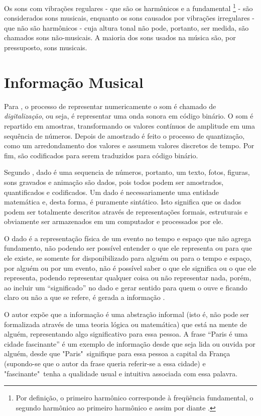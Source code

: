 Os sons com vibrações regulares - que são os harmônicos e a fundamental \footnote{Por definição, o primeiro harmônico corresponde à freqüência fundamental, o segundo harmônico ao primeiro harmônico e assim por diante \cite{muller2007}.} - são considerados sons musicais, enquanto os sons causados por vibrações irregulares - que não são harmônicos - cuja altura tonal não pode, portanto, ser medida, são chamados sons não-musicais. A maioria dos sons usados na música são, por pressuposto, sons musicais.

\section{Informação Musical}
Para , o processo de representar numericamente o som é chamado de \textit{digitalização}, ou seja, é representar uma onda sonora em código binário. O som é repartido em amostras, transformando os valores contínuos de amplitude em uma sequência de números. Depois de amostrado é feito o processo de quantização, como um arredondamento dos valores e assumem valores discretos de tempo. Por fim, são codificados para serem traduzidos para código binário.

Segundo , dado é uma sequencia de números, portanto, um texto, fotos, figuras, sons gravados e animação são dados, pois todos podem ser amostrados, quantificados e codificados. Um dado é necessariamente uma entidade matemática e, desta forma, é puramente sintático. Isto significa que os dados podem ser totalmente descritos através de representações formais, estruturais e obviamente ser armazenados em um computador e processados por ele.

O dado é a representação física de um evento no tempo e espaço que não agrega fundamento, não podendo ser possível entender o que ele representa ou para que ele existe, se somente for disponibilizado para alguém ou para o tempo e espaço, por alguém ou por um evento, não é possível saber o que ele significa ou o que ele representa, podendo representar qualquer coisa ou não representar nada, porém, ao incluir um “significado” no dado e gerar sentido para quem o ouve e ficando claro ou não a que se refere, é gerada a informação \cite{rafael2013}.

O autor  expõe que a informação é uma abstração informal (isto é, não pode ser formalizada através de uma teoria lógica ou matemática) que está na mente de alguém, representando algo significativo para essa pessoa. A frase “Paris é uma cidade fascinante” é um exemplo de informação desde que seja lida ou ouvida por alguém, desde que "Paris"\ signifique para essa pessoa a capital da França (supondo-se que o autor da frase queria referir-se a essa cidade) e "fascinante"\ tenha a qualidade usual e intuitiva associada com essa palavra.

